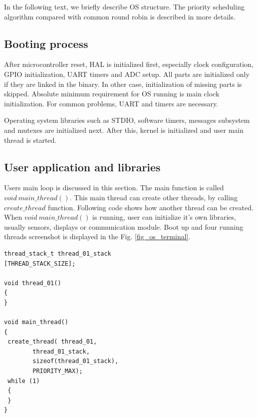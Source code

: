 \documentclass[a4paper, conference]{IEEEtran}
\begin{document}
In the following text, we briefly describe OS structure. The priority scheduling algorithm compared with common round robin is described in more details.

\subsection{Booting process}

After microcontroller reset, HAL is initialized first, especially clock configuration, GPIO initialization, UART timers and ADC setup.
All parts are initialized only if they are linked in the binary. In other case, initialization of missing parts is skipped.
Absolute minimum requirement for OS running is main clock initialization. For common problems, UART and timers are necessary.

Operating system libraries such as STDIO, software timers, messages subsystem and mutexes are initialized next.
After this, kernel is initialized and user main thread is started.

\subsection{User application and libraries}

Users main loop is discussed in this section. The main function is called $void\ main\_thread()$. This main thread can create other threads, by calling $create\_thread$ function. Following code shows how another thread can be created. When $void\ main\_thread()$ is running, user can initialize it's own libraries, usually sensors, displays or communication module. Boot up and four running threads screenshot is displayed in  the Fig. \ref{fig_os_terminal}.

\noindent\begin{minipage}{.45\textwidth}
\lstset{language=C++}    
\begin{lstlisting}[frame=single, caption = Thread creating]
thread_stack_t thread_01_stack
[THREAD_STACK_SIZE];

void thread_01()
{
}

void main_thread()
{
 create_thread(	thread_01, 
		thread_01_stack, 
		sizeof(thread_01_stack), 
		PRIORITY_MAX);
 while (1)
 {
 }
}
\end{lstlisting}
\end{minipage}\hfill
\end{document}
